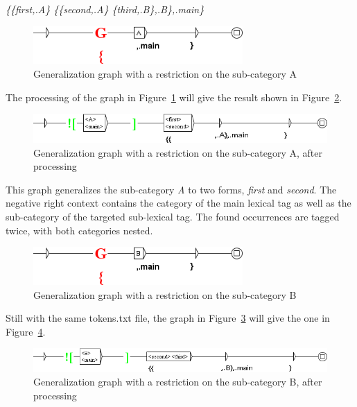 \bigskip
\emph{\{\{first,.A\} \{\{second,.A\} \{third,.B\},.B\},.main\}}

\bigskip
\begin{figure}[!htb]
  \centering
  \includegraphics[width=8cm]{resources/img/graphe_restriction_A.png}
  \caption{Generalization graph with a restriction on the sub-category A}
  \label{fig:graphe_restriction_A}
\end{figure}

\bigskip
\noindent The processing of the graph in Figure~\ref{fig:graphe_restriction_A} will give the result shown in
Figure~\ref{fig:graphe_restriction_A_genere}.

\begin{figure}[!htb]
  \centering
  \includegraphics[width=14cm]{resources/img/graphe_restriction_A_genere.png}
  \caption{Generalization graph with a restriction on the sub-category A, after processing}
  \label{fig:graphe_restriction_A_genere}
\end{figure}

\bigskip
\noindent This graph generalizes the sub-category \textit{A} to two forms, \textit{first} and
\textit{second}. The negative right context contains the category of the main
lexical tag as well as the sub-category of the targeted sub-lexical tag. The found occurrences are
tagged twice, with both categories nested.

\begin{figure}[!htb]
  \centering
  \includegraphics[width=8cm]{resources/img/graphe_restriction_B.png}
  \caption{Generalization graph with a restriction on the sub-category B}
  \label{fig:graphe_restriction_B}
\end{figure}

\bigskip
\noindent Still with the same tokens.txt file, the graph in Figure~\ref{fig:graphe_restriction_B}
will give the one in Figure~\ref{fig:graphe_restriction_B_genere}.

\begin{figure}[!htb]
  \centering
  \includegraphics[width=14cm]{resources/img/graphe_restriction_B_genere.png}
  \caption{Generalization graph with a restriction on the sub-category B, after processing}
  \label{fig:graphe_restriction_B_genere}
\end{figure}

